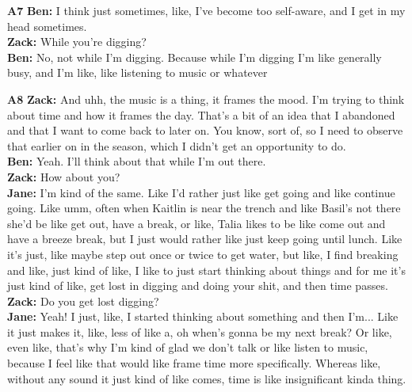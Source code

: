 \documentclass{article}
\begin{document}
\noindent\textbf{A7}\label{sec-A7}\newline
\textbf{Ben:} I think just sometimes, like, I've become too self-aware,
and I get in my head sometimes.\\
\textbf{Zack:} While you're digging?\\
\textbf{Ben:} No, not while I'm digging. Because while I'm digging I'm
like generally busy, and I'm like, like listening to music or whatever\newline

\noindent\textbf{A8}\label{sec-A8}\newline
\textbf{Zack:} And uhh, the music is a thing, it frames the mood. I'm
trying to think about time and how it frames the day. That's a bit of an
idea that I abandoned and that I want to come back to later on. You
know, sort of, so I need to observe that earlier on in the season, which
I didn't get an opportunity to do.\\
\textbf{Ben:} Yeah. I'll think about that while I'm out there.\\
\textbf{Zack:} How about you?\\
\textbf{Jane:} I'm kind of the same. Like I'd rather just like get going
and like continue going. Like umm, often when Kaitlin is near the trench
and like Basil's not there she'd be like get out, have a break, or like,
Talia likes to be like come out and have a breeze break, but I just
would rather like just keep going until lunch. Like it's just, like
maybe step out once or twice to get water, but like, I find breaking and
like, just kind of like, I like to just start thinking about things and
for me it's just kind of like, get lost in digging and doing your shit,
and then time passes.\\
\textbf{Zack:} Do you get lost digging?\\
\textbf{Jane:} Yeah! I just, like, I started thinking about something
and then I'm... Like it just makes it, like, less of like a, oh when's
gonna be my next break? Or like, even like, that's why I'm kind of glad
we don't talk or like listen to music, because I feel like that would
like frame time more specifically. Whereas like, without any sound it
just kind of like comes, time is like insignificant kinda thing.\newline
\end{document}
